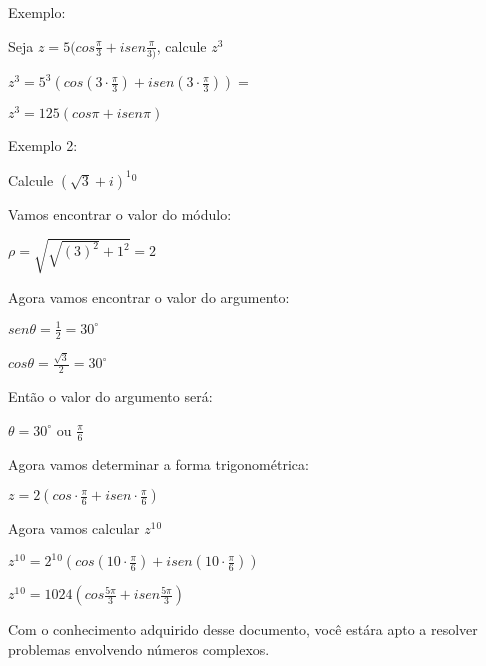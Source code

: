 \documentclass[]{article}
\begin{document}
\begin{large}
\begin{flushleft}
Exemplo: \vspace{.3cm}

Seja $z=5(cos\frac{\pi}{3} + isen\frac{\pi}{3)}$, calcule $z^3$ \vspace{.3cm}

\begin{center}
    $z^3=5^3(cos(3\cdot \frac{\pi}{3}) + isen(3\cdot \frac{\pi}{3}))=$
    
    $z^3=125(cos\pi + isen\pi)$ \vspace{.3cm}
\end{center}

Exemplo 2: \vspace{.3cm}

Calcule $(\sqrt{3}+i)^1{}^0$ \vspace{.3cm}

Vamos encontrar o valor do módulo:

\begin{center}
    $\rho=\sqrt{\sqrt{(3)^2}+1^2} = 2$ \vspace{.3cm}
\end{center}

Agora vamos encontrar o valor do argumento: \vspace{.3cm}

\begin{center}
    $sen\theta=\frac{1}{2}=30^\circ$ \vspace{.3cm}
    
    $cos\theta=\frac{\sqrt{3}}{2}=30^\circ$ \vspace{.3cm}
\end{center}

Então o valor do argumento será: \vspace{.3cm}

\begin{center}
    $\theta=30^\circ$ ou $\frac{\pi}{6}$
\end{center}

Agora vamos determinar a forma trigonométrica: \vspace{.cm}

\begin{center}
    $z=2(cos \cdot \frac{\pi}{6} + isen \cdot \frac{\pi}{6})$
\end{center}

Agora vamos calcular $z^1{}^0$ \vspace{.3cm}

\begin{center}
    $z^1{}^0=2^1{}^0(cos(10 \cdot \frac{\pi}{6}) + isen(10 \cdot \frac{\pi}{6}))$ \vspace{.3cm}
    
    $z^1{}^0=1024(cos\frac{5\pi}{3}+isen\frac{5\pi}{3})$ \vspace{.3cm}
\end{center}


Com o conhecimento adquirido desse documento, você estára apto a resolver problemas envolvendo números complexos.

\end{flushleft}
\end{large}
\end{document}
